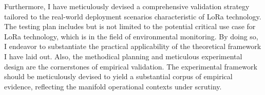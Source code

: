 Furthermore, I have meticulously devised a comprehensive validation strategy tailored to the real-world deployment scenarios characteristic of LoRa technology. The testing plan includes but is not limited to the potential critical use case for LoRa technology, which is in the field of environmental monitoring. By doing so, I endeavor to substantiate the practical applicability of the theoretical framework I have laid out. Also, the methodical planning and meticulous experimental design are the cornerstones of empirical validation. The experimental framework should be meticulously devised to yield a substantial corpus of empirical evidence, reflecting the manifold operational contexts under scrutiny.
